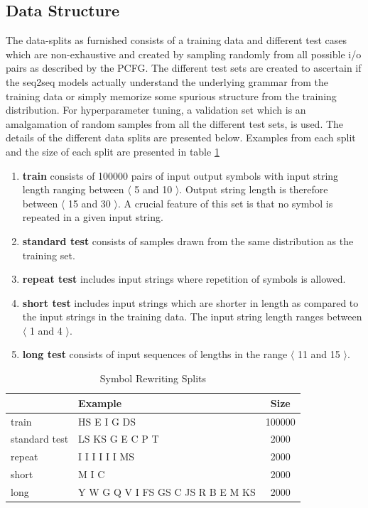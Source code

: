 \subsection{Data Structure}
The data-splits as furnished \citep{Weber2018} consists of a training data and different test cases which are non-exhaustive and created by sampling randomly from all possible i/o pairs as described by the PCFG. The different test sets are created to ascertain if the seq2seq models actually understand the underlying grammar from the training data or simply memorize some spurious structure from the training distribution. For hyperparameter tuning, a validation set which is an amalgamation of random samples from all the different test sets, is used. The details of the different data splits are presented below. Examples from each split and the size of each split are presented in table \ref{sr:stats}
\begin{enumerate}
	\item \textbf{train} consists of 100000 pairs of input output symbols with input string length ranging between $\langle$ 5 and 10 $\rangle$. Output string length is therefore between $\langle$ 15 and 30 $\rangle$. A crucial feature of this set is that no symbol is repeated in a given input string.
	\item \textbf{standard test} consists of samples drawn from the same distribution as the training set.
	\item \textbf{repeat test} includes input strings where repetition of symbols is allowed.
	\item \textbf{short test} includes input strings which are shorter in length as compared to the input strings in the training data. The input string length ranges between $\langle$ 1 and 4 $\rangle$.
	\item \textbf{long test} consists of input sequences of lengths in the range $\langle$ 11 and 15 $\rangle$.
\end{enumerate}

\begin{table}[ht]
	\centering
	\begin{tabular}{l|lc}
		& Example & Size\\
		\hline
		train & HS E I G DS  & 100000 \\
		standard test & LS KS G E C P T & 2000 \\
		repeat & I I I I I I MS & 2000 \\
		short & M I C & 2000 \\
		long & Y W G Q V I FS GS C JS R B E M KS & 2000 \\
	\end{tabular}
	\caption{Symbol Rewriting Splits}
	\label{sr:stats}
\end{table}

